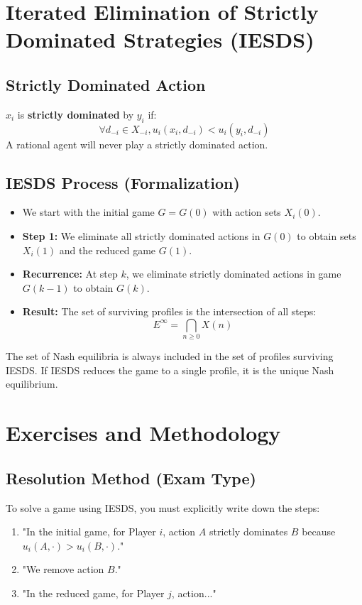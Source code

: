 \section{Iterated Elimination of Strictly Dominated Strategies (IESDS)}

\subsection{Strictly Dominated Action}
\begin{definition}
$x_i$ is \textbf{strictly dominated} by $y_i$ if:
$$\forall d_{-i} \in X_{-i}, u_i(x_i, d_{-i}) < u_i(y_i, d_{-i})$$
A rational agent will never play a strictly dominated action.
\end{definition}

\subsection{IESDS Process (Formalization)}
\begin{itemize}
    \item We start with the initial game $G = G(0)$ with action sets $X_i(0)$.
    \item \textbf{Step 1:} We eliminate all strictly dominated actions in $G(0)$ to obtain sets $X_i(1)$ and the reduced game $G(1)$.
    \item \textbf{Recurrence:} At step $k$, we eliminate strictly dominated actions in game $G(k-1)$ to obtain $G(k)$.
    \item \textbf{Result:} The set of surviving profiles is the intersection of all steps:
    $$E^{\infty} = \bigcap_{n \ge 0} X(n)$$
\end{itemize}

\begin{corollaire}
The set of Nash equilibria is always included in the set of profiles surviving IESDS. If IESDS reduces the game to a single profile, it is the unique Nash equilibrium.
\end{corollaire}

\section{Exercises and Methodology}

\subsection{Resolution Method (Exam Type)}
To solve a game using IESDS, you must explicitly write down the steps:
\begin{enumerate}
    \item "In the initial game, for Player $i$, action $A$ strictly dominates $B$ because $u_i(A, \cdot) > u_i(B, \cdot)$."
    \item "We remove action $B$."
    \item "In the reduced game, for Player $j$, action..."
\end{enumerate}

